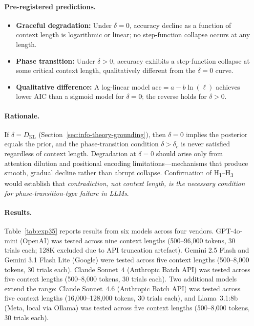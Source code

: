 \documentclass[11pt,a4paper]{article}
\begin{document}
\paragraph{Pre-registered predictions.}
\begin{itemize}
  \item[\textbf{H\textsubscript{1}}] \textbf{Graceful degradation:} Under $\delta = 0$, accuracy decline as a function of context length is logarithmic or linear; no step-function collapse occurs at any length.
  \item[\textbf{H\textsubscript{2}}] \textbf{Phase transition:} Under $\delta > 0$, accuracy exhibits a step-function collapse at some critical context length, qualitatively different from the $\delta = 0$ curve.
  \item[\textbf{H\textsubscript{3}}] \textbf{Qualitative difference:} A log-linear model $\text{acc} = a - b \ln(\ell)$ achieves lower AIC than a sigmoid model for $\delta = 0$; the reverse holds for $\delta > 0$.
\end{itemize}

\paragraph{Rationale.}
If $\delta = D_{\mathrm{KL}}$ (Section~\ref{sec:info-theory-grounding}), then $\delta = 0$ implies the posterior equals the prior, and the phase-transition condition $\delta > \delta_c$ is never satisfied regardless of context length. Degradation at $\delta = 0$ should arise only from attention dilution and positional encoding limitations---mechanisms that produce smooth, gradual decline rather than abrupt collapse. Confirmation of H\textsubscript{1}--H\textsubscript{3} would establish that \emph{contradiction, not context length, is the necessary condition for phase-transition-type failure in LLMs}.

\paragraph{Results.}
Table~\ref{tab:exp35} reports results from six models across four vendors. GPT-4o-mini (OpenAI) was tested across nine context lengths (500--96{,}000 tokens, 30 trials each; 128K excluded due to API truncation artefact). Gemini 2.5 Flash and Gemini 3.1 Flash Lite (Google) were tested across five context lengths (500--8{,}000 tokens, 30 trials each). Claude Sonnet~4 (Anthropic Batch API) was tested across five context lengths (500--8{,}000 tokens, 30 trials each). Two additional models extend the range: Claude Sonnet~4.6 (Anthropic Batch API) was tested across five context lengths (16{,}000--128{,}000 tokens, 30 trials each), and Llama~3.1:8b (Meta, local via Ollama) was tested across five context lengths (500--8{,}000 tokens, 30 trials each).
\end{document}
